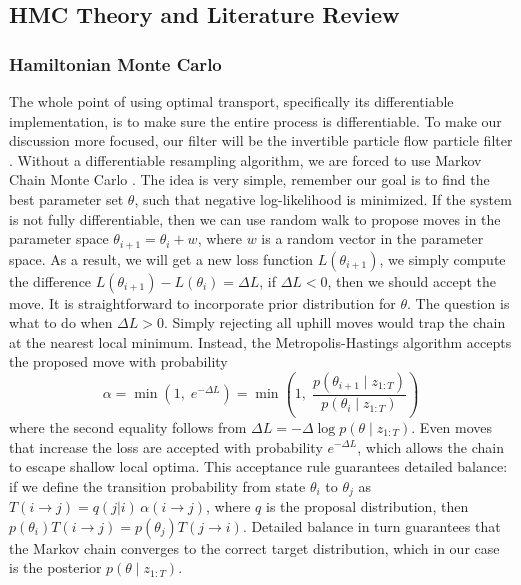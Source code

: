 \documentclass{article}
\begin{document}
\subsection{HMC Theory and Literature Review}

\subsubsection{Hamiltonian Monte Carlo}
The whole point of using optimal transport, specifically its differentiable implementation, is to make sure the entire process is differentiable. To make our discussion more focused, our filter will be the invertible particle flow particle filter \cite{Li-Particle-Filtering-2017}. Without a differentiable resampling algorithm, we are forced to use Markov Chain Monte Carlo \cite{Andrieu2010}. The idea is very simple, remember our goal is to find the best parameter set ${\theta}$, such that negative log-likelihood is minimized. If the system is not fully differentiable, then we can use random walk to propose moves in the parameter space $\theta_{i+1}=\theta_{i}+ w$, where $w$ is a random vector in the parameter space. As a result, we will get a new loss function $L(\theta_{i+1})$, we simply compute the difference $L(\theta_{i+1})-L(\theta_{i})=\Delta L$, if $\Delta L<0$, then we should accept the move. It is straightforward to incorporate prior distribution for $\theta$. The question is what to do when $\Delta L > 0$. Simply rejecting all uphill moves would trap the chain at the nearest local minimum. Instead, the Metropolis-Hastings algorithm\cite{Metropolis1953} accepts the proposed move with probability
\begin{equation}
    \alpha = \min\!\left(1,\; e^{-\Delta L}\right) = \min\!\left(1,\; \frac{p(\theta_{i+1} \mid z_{1:T})}{p(\theta_i \mid z_{1:T})}\right)
\end{equation}
where the second equality follows from $\Delta L = -\Delta \log p(\theta \mid z_{1:T})$. Even moves that increase the loss are accepted with probability $e^{-\Delta L}$, which allows the chain to escape shallow local optima. This acceptance rule guarantees detailed balance: if we define the transition probability from state $\theta_i$ to $\theta_j$ as $T(i\to j) = q(j|i)\,\alpha(i\to j)$, where $q$ is the proposal distribution, then $p(\theta_i) T(i\to j) = p(\theta_j) T(j\to i)$. Detailed balance in turn guarantees that the Markov chain converges to the correct target distribution, which in our case is the posterior $p(\theta \mid z_{1:T})$\cite{Neal-2012-MCMC-Hamiltonian-Dynamics-ARXIV-1206-1901v1}.
\end{document}
